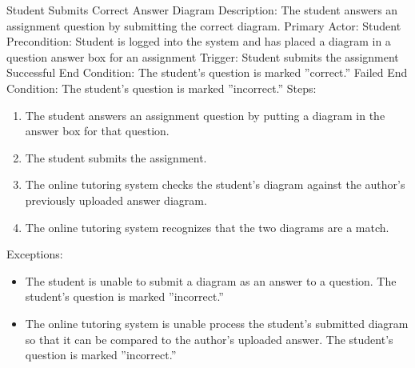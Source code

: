     \begin{section}{Student Submits Correct Answer Diagram}
        Description: The student answers an assignment question by submitting the correct diagram. \newline
        Primary Actor: Student \newline
        Precondition: Student is logged into the system and has placed a diagram in a question answer box for an assignment \newline  
        Trigger: Student submits the assignment \newline
        Successful End Condition: The student's question is marked ''correct.'' \newline
        Failed End Condition: The student's question is marked ''incorrect.'' \newline
        \newline
        Steps:
        \begin{enumerate}
            \item{The student answers an assignment question by putting a diagram in the answer box for that question.}
            \item{The student submits the assignment.}
            \item{The online tutoring system checks the student's diagram against the author's previously uploaded answer diagram.}
            \item{The online tutoring system recognizes that the two diagrams are a match.}
        \end{enumerate}
        Exceptions:
        \begin{itemize}
            \item{The student is unable to submit a diagram as an answer to a question.  The student's question is marked ''incorrect.''}  
            \item{The online tutoring system is unable process the student's submitted diagram so that it can be 
            compared to the author's uploaded answer.  The student's question is marked ''incorrect.''}
        \end{itemize}
    \end{section}
    
